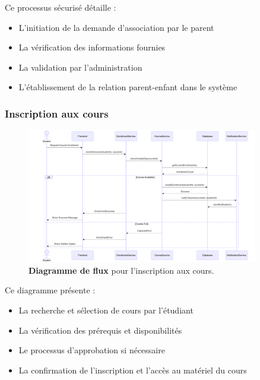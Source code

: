 Ce processus sécurisé détaille :

\begin{itemize}
  \item L'initiation de la demande d'association par le parent
  
  \item La vérification des informations fournies
  
  \item La validation par l'administration
  
  \item L'établissement de la relation parent-enfant dans le système
\end{itemize}

\subsubsection{Inscription aux cours}

\begin{figure}[H]
  \centering
  \includegraphics[width=0.9\textwidth,keepaspectratio]{pfe-pics/diagrames/Course Enrollment Process.png}
  \caption{\textbf{Diagramme de flux} pour l'inscription aux cours.}
  \label{fig:course_enrollment}
\end{figure}

Ce diagramme présente :

\begin{itemize}
  \item La recherche et sélection de cours par l'étudiant
  
  \item La vérification des prérequis et disponibilités
  
  \item Le processus d'approbation si nécessaire
  
  \item La confirmation de l'inscription et l'accès au matériel du cours
\end{itemize}

